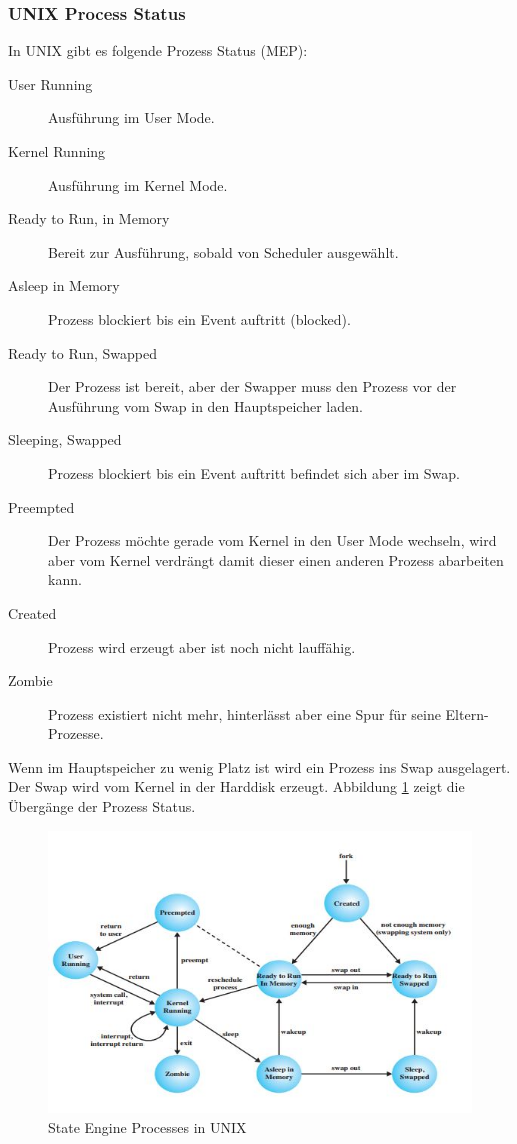 \subsubsection{UNIX Process Status}
In UNIX gibt es folgende Prozess Status (MEP):
\begin{description}
	\item[User Running] Ausführung im User Mode.
	\item[Kernel Running] Ausführung im Kernel Mode.
	\item[Ready to Run, in Memory] Bereit zur Ausführung, sobald von Scheduler ausgewählt.
	\item[Asleep in Memory] Prozess blockiert bis ein Event auftritt (blocked).
	\item[Ready to Run, Swapped] Der Prozess ist bereit, aber der Swapper muss den Prozess vor der Ausführung vom Swap in den Hauptspeicher laden.
	\item[Sleeping, Swapped] Prozess blockiert bis ein Event auftritt befindet sich aber im Swap.
	\item[Preempted] Der Prozess möchte gerade vom Kernel in den User Mode wechseln, wird aber vom Kernel verdrängt damit dieser einen anderen Prozess abarbeiten kann.
	\item[Created] Prozess wird erzeugt aber ist noch nicht lauffähig.
	\item[Zombie] Prozess existiert nicht mehr, hinterlässt aber eine Spur für seine Eltern-Prozesse.
\end{description}
Wenn im Hauptspeicher zu wenig Platz ist wird ein Prozess ins Swap ausgelagert. Der Swap wird vom Kernel in der Harddisk erzeugt. Abbildung \ref{fig:system-software-state-engine-processes-unix} zeigt die Übergänge der Prozess Status.

\begin{figure}[h!]
\centering
\includegraphics[width=0.9\linewidth]{fig/system-software-state-engine-processes-unix}
\caption{State Engine Processes in UNIX}
\label{fig:system-software-state-engine-processes-unix}
\end{figure}


